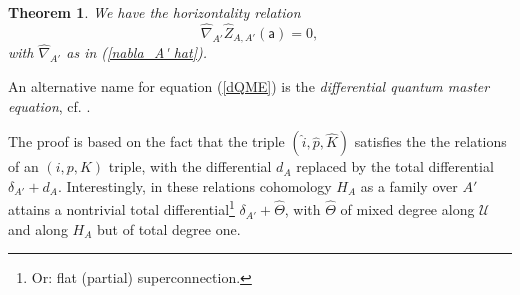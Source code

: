 \documentclass[11pt,a4paper]{amsart}
\theoremstyle{plain} %
\newtheorem{thm}{Theorem}[section]
\theoremstyle{definition}
\theoremstyle{remark}
\newcommand{\sfa}{\mathsf{a}}
\newcommand{\wh}{\widehat}
\newcommand{\mc}{\mathcal}
\begin{document}
{%


\begin{thm}\label{thm: horizontality of Zhat}
    We have the horizontality relation
    \begin{equation}\label{dQME}
        \wh\nabla_{A'}\wh{Z}_{A,A'}(\sfa)=0,
    \end{equation}
    with $\wh\nabla_{A'}$ as in (\ref{nabla_A' hat}).
\end{thm}
An alternative name for equation (\ref{dQME}) is the \emph{differential quantum master equation}, cf. \cite{Bonechi2012}.

The proof is based on the fact that the triple $(\wh{i},\wh{p},\wh{K})$ satisfies the the relations of %
an $(i,p,K)$ triple, 
with the differential $d_A$ replaced by the total differential $\delta_{A'}+d_A$. %
Interestingly, in these relations cohomology $H_A$ as a family over $A'$ attains a nontrivial total differential\footnote{Or: flat (partial) superconnection.} $\delta_{A'}+\wh\Theta$, with $\wh\Theta$ of mixed degree along $\mc{U}$ and along $H_A$ but of total degree one. 


}
\end{document}
